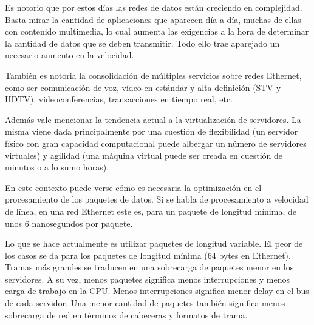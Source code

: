 Es notorio que por estos días las redes de datos están creciendo en complejidad. Basta mirar la cantidad de aplicaciones que aparecen día a día, muchas de ellas con contenido multimedia, lo cual aumenta las exigencias a la hora de determinar la cantidad de datos que se deben transmitir. Todo ello trae aparejado un necesario aumento en la velocidad. 


También es notoria la consolidación de múltiples servicios sobre redes Ethernet, como ser comunicación de voz, vídeo en estándar y alta definición (STV y HDTV), videoconferencias, transacciones en tiempo real, etc.


Además vale mencionar la tendencia actual a la virtualización de servidores. La misma viene dada principalmente por una cuestión de flexibilidad (un servidor físico con gran capacidad computacional puede albergar un número de servidores virtuales) y agilidad (una máquina virtual puede ser creada en cuestión de minutos o a lo sumo horas).

En este contexto puede verse cómo es necesaria la optimización en el procesamiento de los paquetes de datos. Si se habla de procesamiento a velocidad de línea, en una red Ethernet este es, para un paquete de longitud mínima, de unos 6 nanosegundos por paquete.


Lo que se hace actualmente es utilizar paquetes de longitud variable. El peor de los casos se da para los paquetes de longitud mínima (64 bytes en Ethernet). Tramas más grandes se traducen en una sobrecarga de paquetes menor en los servidores. A su vez, menos paquetes significa menos interrupciones y menos carga de trabajo en la CPU. Menos interrupciones significa menor delay en el bus de cada servidor. Una menor cantidad de paquetes también significa menos sobrecarga de red en términos de cabeceras y formatos de trama.

